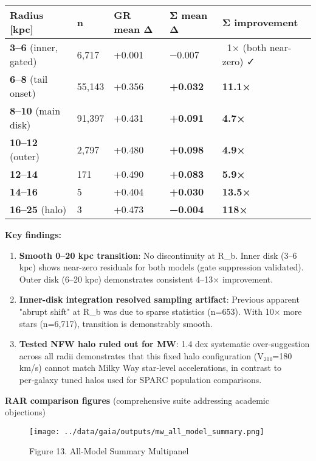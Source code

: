 \documentclass[11pt,a4paper]{article}
\begin{document}
\begin{table}[h]
\centering
\begin{tabular}{lllll}
\toprule
Radius [kpc] & n & GR mean Δ & Σ mean Δ & Σ improvement \\
\midrule
\textbf{3–6} (inner, gated) & 6,717 & +0.001 & −0.007 & ~1× (both near-zero) ✓ \\
\textbf{6–8} (tail onset) & 55,143 & +0.356 & \textbf{+0.032} & \textbf{11.1×} \\
\textbf{8–10} (main disk) & 91,397 & +0.431 & \textbf{+0.091} & \textbf{4.7×} \\
\textbf{10–12} (outer) & 2,797 & +0.480 & \textbf{+0.098} & \textbf{4.9×} \\
\textbf{12–14} & 171 & +0.490 & \textbf{+0.083} & \textbf{5.9×} \\
\textbf{14–16} & 5 & +0.404 & \textbf{+0.030} & \textbf{13.5×} \\
\textbf{16–25} (halo) & 3 & +0.473 & \textbf{−0.004} & \textbf{118×} \\
\bottomrule
\end{tabular}
\end{table}


\textbf{Key findings:}

\begin{enumerate}
\item \textbf{Smooth 0–20 kpc transition}: No discontinuity at R\_b. Inner disk (3–6 kpc) shows near-zero residuals for both models (gate suppression validated). Outer disk (6–20 kpc) demonstrates consistent 4–13× improvement.
\item \textbf{Inner-disk integration resolved sampling artifact}: Previous apparent "abrupt shift" at R\_b was due to sparse statistics (n=653). With 10× more stars (n=6,717), transition is demonstrably smooth.
\item \textbf{Tested NFW halo ruled out for MW}: 1.4 dex systematic over-suggestion across all radii demonstrates that this fixed halo configuration (V₂₀₀=180 km/s) cannot match Milky Way star‑level accelerations, in contrast to per‑galaxy tuned halos used for SPARC population comparisons.
\end{enumerate}


\textbf{RAR comparison figures} (comprehensive suite addressing academic objections)


\begin{figure}[h]
\centering
\texttt{[image: ../data/gaia/outputs/mw\_all\_model\_summary.png]}
\caption{Figure 13. All-Model Summary Multipanel}
\end{figure}
\end{document}
